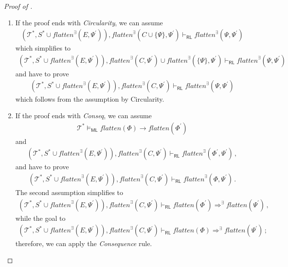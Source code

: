 \documentclass{article}
\newcommand{\RL}{\mathsf{RL}}
\newcommand{\ML}{\mathsf{ML}}
\begin{document}
\begin{proof}[Proof of ]
\begin{enumerate}
    \item If the proof ends with \emph{Circularity}, we can assume
        \begin{align*}
            (\mathcal{T}^*, S^* \cup \mathit{flatten}^\exists(E, \Psi^\prime)),
            \mathit{flatten}^\exists(C \cup \{ \Psi \}, \Psi^\prime) \vdash_\RL
            \mathit{flatten}^\exists(\Psi, \Psi^\prime)
        \end{align*}
        which simplifies to
        \begin{align*}
            (\mathcal{T}^*, S^* \cup \mathit{flatten}^\exists(E, \Psi^\prime)),
            \mathit{flatten}^\exists(C, \Psi^\prime) \cup \mathit{flatten}^\exists(\{ \Psi \}, \Psi^\prime) \vdash_\RL
            \mathit{flatten}^\exists(\Psi, \Psi^\prime)
        \end{align*}
        and have to prove
        \begin{align*}
            (\mathcal{T}^*, S^* \cup \mathit{flatten}^\exists(E, \Psi^\prime)),
            \mathit{flatten}^\exists(C, \Psi^\prime) \vdash_\RL
            \mathit{flatten}^\exists(\Psi, \Psi^\prime)
        \end{align*}
        which follows from the assumption by Circularity.
        
    \item If the proof ends with \emph{Conseq}, we can assume
    \begin{align*}
        \mathcal{T}^* \vDash_\ML \mathit{flatten}(\Phi) \rightarrow \mathit{flatten}(\Phi^\prime)
    \end{align*}
    and
    \begin{align*}
        (\mathcal{T}^*, S^* \cup \mathit{flatten}^\exists(E, \Psi^\prime)), \mathit{flatten}^\exists(C, \Psi^\prime) \vdash_\RL
          \mathit{flatten}^\exists(\Phi^\prime, \Psi^\prime) \, ,
    \end{align*}
    and have to prove
    \begin{align*}
        (\mathcal{T}^*, S^* \cup \mathit{flatten}^\exists(E, \Psi^\prime)), \mathit{flatten}^\exists(C, \Psi^\prime) \vdash_\RL
          \mathit{flatten}^\exists(\Phi, \Psi^\prime)  \, .
    \end{align*}
    The second assumption simplifies to
    \begin{align*}
        (\mathcal{T}^*, S^* \cup \mathit{flatten}^\exists(E, \Psi^\prime)), \mathit{flatten}^\exists(C, \Psi^\prime) \vdash_\RL
          \mathit{flatten}(\Phi^\prime) \Rightarrow^\exists \mathit{flatten}(\Psi^\prime) \, ,
    \end{align*}
    while the goal to
    \begin{align*}
        (\mathcal{T}^*, S^* \cup \mathit{flatten}^\exists(E, \Psi^\prime)), \mathit{flatten}^\exists(C, \Psi^\prime) \vdash_\RL
          \mathit{flatten}(\Phi) \Rightarrow^\exists \mathit{flatten}(\Psi^\prime) \, ;
    \end{align*}
    therefore, we can apply the \emph{Consequence} rule.        
        

\end{enumerate}
\end{proof}
\end{document}
